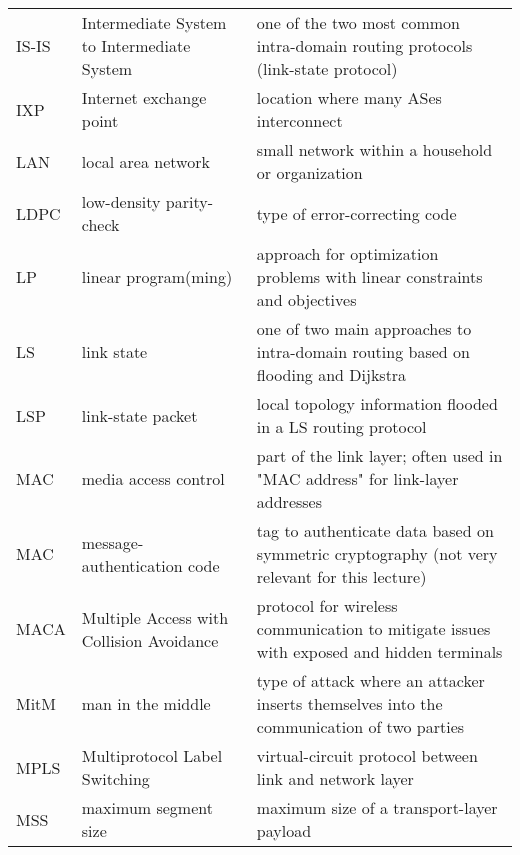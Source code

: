 \begin{longtable}{p{1.7cm} | p{5cm} | p{8cm}}
    IS-IS   & Intermediate System to Intermediate System  & one of the two most common intra-domain routing protocols (link-state protocol)                     \\
    IXP     & Internet exchange point                     & location where many ASes interconnect                                                               \\
    LAN     & local area network                          & small network within a household or organization                                                    \\
    LDPC    & low-density parity-check                    & type of error-correcting code                                                                       \\
    LP      & linear program(ming)                        & approach for optimization problems with linear constraints and objectives                           \\
    LS      & link state                                  & one of two main approaches to intra-domain routing based on flooding and Dijkstra                   \\
    LSP     & link-state packet                           & local topology information flooded in a LS routing protocol                                         \\
    MAC     & media access control                        & part of the link layer; often used in "MAC address" for link-layer addresses                        \\
    MAC     & message-authentication code                 & tag to authenticate data based on symmetric cryptography (not very relevant for this lecture)     \\
    MACA    & Multiple Access with Collision Avoidance    & protocol for wireless communication to mitigate issues with exposed and hidden terminals            \\
    MitM    & man in the middle                           & type of attack where an attacker inserts themselves into the communication of two parties           \\
    MPLS    & Multiprotocol Label Switching               & virtual-circuit protocol between link and network layer                                             \\
    MSS     & maximum segment size                        & maximum size of a transport-layer payload                                                           \\

\end{longtable}
